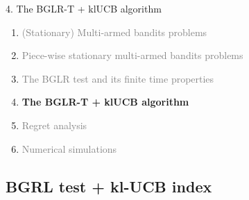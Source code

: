 \documentclass[11pt,english,ignorenonframetext,]{beamer}
\begin{document}
\begin{frame}{4. The BGLR-T + klUCB algorithm}

  \begin{enumerate}
    \item
    \textcolor{gray}{
      (Stationary) Multi-armed bandits problems
    }
    \vspace*{15pt}

    \item
    \textcolor{gray}{
      Piece-wise stationary multi-armed bandits problems
    }
    \vspace*{15pt}

    \item
    \textcolor{gray}{
      The BGLR test and its finite time properties
    }
    \vspace*{15pt}

    \item
    \alert{\textbf{%
      The BGLR-T + klUCB algorithm
    }}
    \vspace*{15pt}

    \item
    \textcolor{gray}{
      Regret analysis
    }
    \vspace*{15pt}

    \item
    \textcolor{gray}{
      Numerical simulations
    }
  \end{enumerate}

\end{frame}

\subsection{\hfill{}BGRL test + kl-UCB index\hfill{}}
\end{document}

